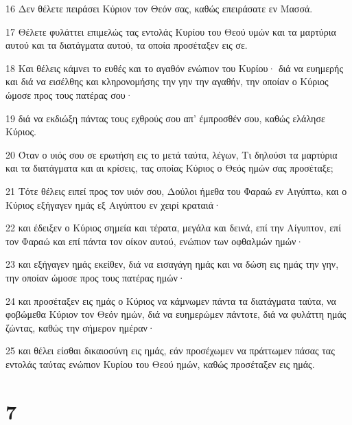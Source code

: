 \par 16 Δεν θέλετε πειράσει Κύριον τον Θεόν σας, καθώς επειράσατε εν Μασσά.
\par 17 Θέλετε φυλάττει επιμελώς τας εντολάς Κυρίου του Θεού υμών και τα μαρτύρια αυτού και τα διατάγματα αυτού, τα οποία προσέταξεν εις σε.
\par 18 Και θέλεις κάμνει το ευθές και το αγαθόν ενώπιον του Κυρίου· διά να ευημερής και διά να εισέλθης και κληρονομήσης την γην την αγαθήν, την οποίαν ο Κύριος ώμοσε προς τους πατέρας σου·
\par 19 διά να εκδιώξη πάντας τους εχθρούς σου απ' έμπροσθέν σου, καθώς ελάλησε Κύριος.
\par 20 Όταν ο υιός σου σε ερωτήση εις το μετά ταύτα, λέγων, Τι δηλούσι τα μαρτύρια και τα διατάγματα και αι κρίσεις, τας οποίας Κύριος ο Θεός ημών σας προσέταξε;
\par 21 Τότε θέλεις ειπεί προς τον υιόν σου, Δούλοι ήμεθα του Φαραώ εν Αιγύπτω, και ο Κύριος εξήγαγεν ημάς εξ Αιγύπτου εν χειρί κραταιά·
\par 22 και έδειξεν ο Κύριος σημεία και τέρατα, μεγάλα και δεινά, επί την Αίγυπτον, επί τον Φαραώ και επί πάντα τον οίκον αυτού, ενώπιον των οφθαλμών ημών·
\par 23 και εξήγαγεν ημάς εκείθεν, διά να εισαγάγη ημάς και να δώση εις ημάς την γην, την οποίαν ώμοσε προς τους πατέρας ημών·
\par 24 και προσέταξεν εις ημάς ο Κύριος να κάμνωμεν πάντα τα διατάγματα ταύτα, να φοβώμεθα Κύριον τον Θεόν ημών, διά να ευημερώμεν πάντοτε, διά να φυλάττη ημάς ζώντας, καθώς την σήμερον ημέραν·
\par 25 και θέλει είσθαι δικαιοσύνη εις ημάς, εάν προσέχωμεν να πράττωμεν πάσας τας εντολάς ταύτας ενώπιον Κυρίου του Θεού ημών, καθώς προσέταξεν εις ημάς.

\chapter{7}

